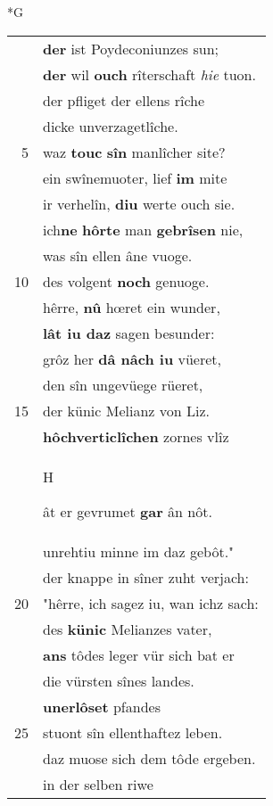 \documentclass[8pt,a4paper,notitlepage]{article}
\begin{document}
\begin{table}[ht]
\begin{minipage}[t]{0.5\linewidth}
\small
\begin{center}*G
\end{center}
\begin{tabular}{rl}
 & \textbf{der} ist Poydeconiunzes sun;\\ 
 & \textbf{der} wil \textbf{ouch} rîterschaft \textit{hie} tuon.\\ 
 & der pfliget der ellens rîche\\ 
 & dicke unverzagetlîche.\\ 
5 & waz \textbf{touc} \textbf{sîn} manlîcher site?\\ 
 & ein swînemuoter, lief \textbf{im} mite\\ 
 & ir verhelîn, \textbf{diu} werte ouch sie.\\ 
 & ich\textbf{ne} \textbf{hôrte} man \textbf{gebrîsen} nie,\\ 
 & was sîn ellen âne vuoge.\\ 
10 & des volgent \textbf{noch} genuoge.\\ 
 & hêrre, \textbf{nû} hœret ein wunder,\\ 
 & \textbf{lât iu daz} sagen besunder:\\ 
 & grôz her \textbf{dâ nâch iu} vüeret,\\ 
 & den sîn ungevüege rüeret,\\ 
15 & der künic Melianz von Liz.\\ 
 & \textbf{hôchverticlîchen} zornes vlîz\\ 
 & \begin{large}H\end{large}ât er gevrumet \textbf{gar} ân nôt.\\ 
 & unrehtiu minne im daz gebôt."\\ 
 & der knappe in sîner zuht verjach:\\ 
20 & "hêrre, ich sagez iu, wan ichz sach:\\ 
 & des \textbf{künic} Melianzes vater,\\ 
 & \textbf{an}\textbf{s} tôdes leger vür sich bat er\\ 
 & die vürsten sînes landes.\\ 
 & \textbf{unerlôset} pfandes\\ 
25 & stuont sîn ellenthaftez leben.\\ 
 & daz muose sich dem tôde ergeben.\\ 
 & in der selben riwe\\ 

\end{tabular}
\end{minipage}
\end{table}
\end{document}
